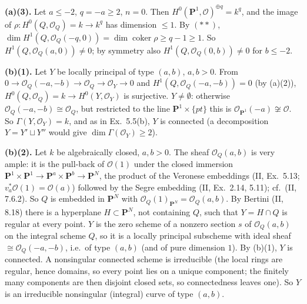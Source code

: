 \documentclass[11pt]{article}
\begin{document}
\textbf{(a)(3).} Let $a\le-2$, $q=-a\ge2$, $n=0$. Then $H^0(\mathbf P^1,\mathcal O)^{\oplus q}=k^q$, and the image of $\rho\colon H^0(Q,\mathcal O_Q)=k\to k^q$ has dimension $\le1$. By $(**)$, $\dim H^1(Q,\mathcal O_Q(-q,0))=\dim\operatorname{coker}\rho\ge q-1\ge1$. So $H^1(Q,\mathcal O_Q(a,0))\ne0$; by symmetry also $H^1(Q,\mathcal O_Q(0,b))\ne0$ for $b\le-2$.

\textbf{(b)(1).} Let $Y$ be locally principal of type $(a,b)$, $a,b>0$. From $0\to\mathcal O_Q(-a,-b)\to\mathcal O_Q\to\mathcal O_Y\to0$ and $H^1(Q,\mathcal O_Q(-a,-b))=0$ (by (a)(2)), $H^0(Q,\mathcal O_Q)=k\to H^0(Y,\mathcal O_Y)$ is surjective. $Y\ne\emptyset$: otherwise $\mathcal O_Q(-a,-b)\cong\mathcal O_Q$, but restricted to the line $\mathbf P^1\times\{pt\}$ this is $\mathcal O_{\mathbf P^1}(-a)\not\cong\mathcal O$. So $\Gamma(Y,\mathcal O_Y)=k$, and as in Ex.~5.5(b), $Y$ is connected (a decomposition $Y=Y'\sqcup Y''$ would give $\dim\Gamma(\mathcal O_Y)\ge2$).

\textbf{(b)(2).} Let $k$ be algebraically closed, $a,b>0$. The sheaf $\mathcal O_Q(a,b)$ is very ample: it is the pull-back of $\mathcal O(1)$ under the closed immersion $\mathbf P^1\times\mathbf P^1\to\mathbf P^a\times\mathbf P^b\to\mathbf P^N$, the product of the Veronese embeddings (II, Ex.~5.13; $v_a^*\mathcal O(1)=\mathcal O(a)$) followed by the Segre embedding (II, Ex.~2.14, 5.11); cf.\ (II, 7.6.2). So $Q$ is embedded in $\mathbf P^N$ with $\mathcal O_Q(1)_{\mathbf P^N}=\mathcal O_Q(a,b)$. By Bertini (II, 8.18) there is a hyperplane $H\subset\mathbf P^N$, not containing $Q$, such that $Y=H\cap Q$ is regular at every point. $Y$ is the zero scheme of a nonzero section $s$ of $\mathcal O_Q(a,b)$ on the integral scheme $Q$, so it is a locally principal subscheme with ideal sheaf $\cong\mathcal O_Q(-a,-b)$, i.e.\ of type $(a,b)$ (and of pure dimension $1$). By (b)(1), $Y$ is connected. A nonsingular connected scheme is irreducible (the local rings are regular, hence domains, so every point lies on a unique component; the finitely many components are then disjoint closed sets, so connectedness leaves one). So $Y$ is an irreducible nonsingular (integral) curve of type $(a,b)$.
\end{document}
